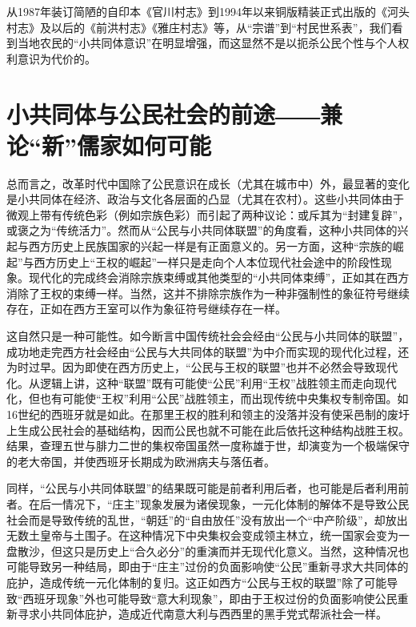 \documentclass[a4paper,12pt,punct=kaiming]{ctexart}
\begin{document}
从1987年装订简陋的自印本《官川村志》到1994年以来铜版精装正式出版的《河头村志》及以后的《前洪村志》《雅庄村志》等，从“宗谱”到“村民世系表”，我们看到当地农民的“小共同体意识”在明显增强，而这显然不是以扼杀公民个性与个人权利意识为代价的。

\section*{小共同体与公民社会的前途――兼论“新”儒家如何可能}

总而言之，改革时代中国除了公民意识在成长（尤其在城市中）外，最显著的变化是小共同体在经济、政治与文化各层面的凸显（尤其在农村）。这些小共同体由于微观上带有传统色彩（例如宗族色彩）而引起了两种议论：或斥其为“封建复辟”，或褒之为“传统活力”。然而从“公民与小共同体联盟”的角度看，这种小共同体的兴起与西方历史上民族国家的兴起一样是有正面意义的。另一方面，这种“宗族的崛起”与西方历史上“王权的崛起”一样只是走向个人本位现代社会途中的阶段性现象。现代化的完成终会消除宗族束缚或其他类型的“小共同体束缚”，正如其在西方消除了王权的束缚一样。当然，这并不排除宗族作为一种非强制性的象征符号继续存在，正如在西方王室可以作为象征符号继续存在一样。

这自然只是一种可能性。如今断言中国传统社会会经由“公民与小共同体的联盟”，成功地走完西方社会经由“公民与大共同体的联盟”为中介而实现的现代化过程，还为时过早。因为即使在西方历史上，“公民与王权的联盟”也并不必然会导致现代化。从逻辑上讲，这种“联盟”既有可能使“公民”利用“王权”战胜领主而走向现代化，但也有可能使“王权”利用“公民”战胜领主，而出现传统中央集权专制帝国。如16世纪的西班牙就是如此。在那里王权的胜利和领主的没落并没有使采邑制的废圩上生成公民社会的基础结构，因而公民也就不可能在此后依托这种结构战胜王权。结果，查理五世与腓力二世的集权帝国虽然一度称雄于世，却演变为一个极端保守的老大帝国，并使西班牙长期成为欧洲病夫与落伍者。

同样，“公民与小共同体联盟”的结果既可能是前者利用后者，也可能是后者利用前者。在后一情况下，“庄主”现象发展为诸侯现象，一元化体制的解体不是导致公民社会而是导致传统的乱世，“朝廷”的“自由放任”没有放出一个“中产阶级”，却放出无数土皇帝与土围子。在这种情况下中央集权会变成领主林立，统一国家会变为一盘散沙，但这只是历史上“合久必分”的重演而并无现代化意义。当然，这种情况也可能导致另一种结局，即由于“庄主”过份的负面影响使“公民”重新寻求大共同体的庇护，造成传统一元化体制的复归。这正如西方“公民与王权的联盟”除了可能导致“西班牙现象”外也可能导致“意大利现象”，即由于王权过份的负面影响使公民重新寻求小共同体庇护，造成近代南意大利与西西里的黑手党式帮派社会一样。
\end{document}
